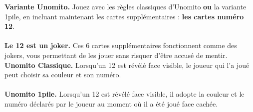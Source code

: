 \documentclass[a4paper]{memoir}
\begin{document}
{\footnotesize

\noindent
\textbf{ Variante Unomito.} Jouez avec les règles classiques d'Unomito \textbf{ou} la variante 1pile, en incluant maintenant les cartes supplémentaires : \textbf{les cartes numéro 12}.
\\
\\
\noindent
\textbf{ Le 12 est un joker.} Ces 6 cartes supplémentaires fonctionnent comme des jokers, vous permettant de les jouer sans risquer d'être accusé de mentir.
\newpage
\noindent
\textbf{ Unomito Classique.} Lorsqu'un 12 est révélé face visible, le joueur qui l'a joué peut choisir sa couleur et son numéro.
\\
\\
\noindent
\textbf{ Unomito 1pile.} Lorsqu'un 12 est révélé face visible, il adopte la couleur et le numéro déclarés par le joueur au moment où il a été joué face cachée.
}
\end{document}
